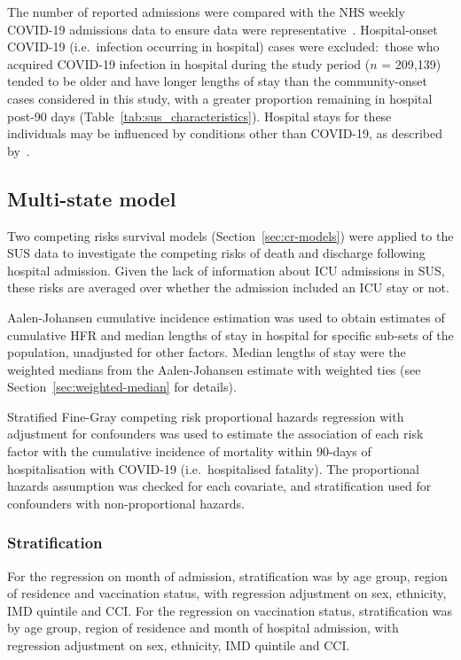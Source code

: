 The number of reported admissions were compared with the NHS weekly COVID-19 admissions data to ensure data were representative~\parencite{NHS-England2022-bh}. Hospital-onset COVID-19 (i.e.\ infection occurring in hospital) cases were excluded:\ those who acquired COVID-19 infection in hospital during the study period ($n$ = 209,139) tended to be older and have longer lengths of stay than the community-onset cases considered in this study, with a greater proportion remaining in hospital post-90 days (Table~\ref{tab:sus_characteristics}). Hospital stays for these individuals may be influenced by conditions other than COVID-19, as described by~\cite{Bhattacharya2021-wq}.

\subsection{Multi-state model}

Two competing risks survival models (Section~\ref{sec:cr-models}) were applied to the SUS data to investigate the competing risks of death and discharge following hospital admission. Given the lack of information about ICU admissions in SUS, these risks are averaged over whether the admission included an ICU stay or not.

Aalen-Johansen cumulative incidence estimation was used to obtain estimates of cumulative HFR and median lengths of stay in hospital for specific sub-sets of the population, unadjusted for other factors. Median lengths of stay were the weighted medians from the Aalen-Johansen estimate with weighted ties (see Section~\ref{sec:weighted-median} for details).

Stratified Fine-Gray competing risk proportional hazards regression with adjustment for confounders was used to estimate the association of each risk factor with the cumulative incidence of mortality within 90-days of hospitalisation with COVID-19 (i.e.\ hospitalised fatality). The proportional hazards assumption was checked for each covariate, and stratification used for confounders with non-proportional hazards.

\subsubsection{Stratification}

For the regression on month of admission, stratification was by age group, region of residence and vaccination status, with regression adjustment on sex, ethnicity, IMD quintile and CCI\@. For the regression on vaccination status, stratification was by age group, region of residence and month of hospital admission, with regression adjustment on sex, ethnicity, IMD quintile and CCI\@.

